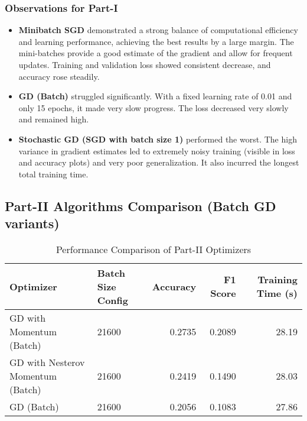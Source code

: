 \documentclass[11pt,a4paper]{article}
\begin{document}
\subsubsection{Observations for Part-I}
\begin{itemize}
    \item \textbf{Minibatch SGD} demonstrated a strong balance of computational efficiency and learning performance, achieving the best results by a large margin. The mini-batches provide a good estimate of the gradient and allow for frequent updates. Training and validation loss showed consistent decrease, and accuracy rose steadily.
    \item \textbf{GD (Batch)} struggled significantly. With a fixed learning rate of 0.01 and only 15 epochs, it made very slow progress. The loss decreased very slowly and remained high.
    \item \textbf{Stochastic GD (SGD with batch size 1)} performed the worst. The high variance in gradient estimates led to extremely noisy training (visible in loss and accuracy plots) and very poor generalization. It also incurred the longest total training time.
\end{itemize}

\subsection{Part-II Algorithms Comparison (Batch GD variants)}
\begin{table}[H]
    \centering
    \caption{Performance Comparison of Part-II Optimizers}
    \label{tab:part2_summary}
    \begin{tabular}{@{}llrrr@{}}
        \toprule
        Optimizer                       & Batch Size Config   & Accuracy & F1 Score & Training Time (s) \\ \midrule
        GD with Momentum (Batch)        & 21600               & 0.2735   & 0.2089   & 28.19             \\
        GD with Nesterov Momentum (Batch) & 21600               & 0.2419   & 0.1490   & 28.03             \\
        GD (Batch)                      & 21600               & 0.2056   & 0.1083   & 27.86             \\ \bottomrule
    \end{tabular}
\end{table}
\end{document}
